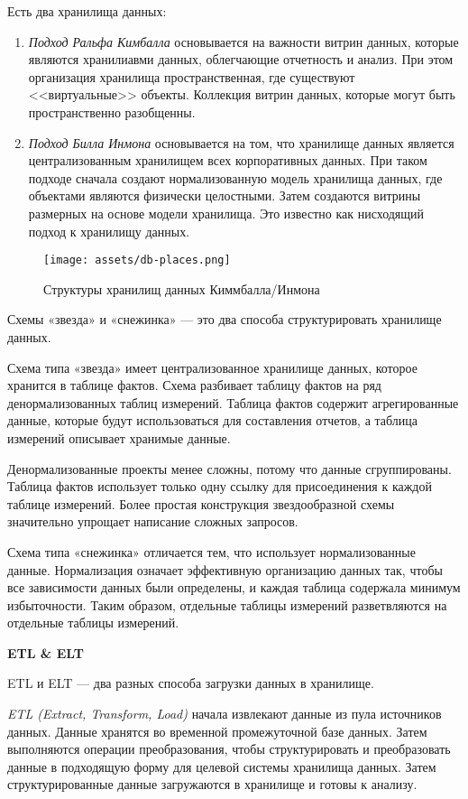 Есть два хранилища данных:
\begin{enumerate}
	\item \textit{Подход Ральфа Кимбалла} основывается на важности витрин данных, которые являются хранилиавми данных, облегчающие отчетность и анализ. При этом организация хранилища пространственная, где существуют <<виртуальные>> объекты. Коллекция витрин данных, которые могут быть пространственно разобщенны.
	\item \textit{Подход Билла Инмона} основывается на том, что хранилище данных является централизованным хранилищем всех корпоративных данных. При таком подходе сначала создают нормализованную модель хранилища данных, где объектами являются физически целостными. Затем создаются витрины размерных на основе модели хранилища. Это известно как нисходящий подход к хранилищу данных.
\end{enumerate}

\begin{figure}[ht!]
	\centering
	\texttt{[image: assets/db-places.png]}
	\caption{Структуры хранилищ данных Киммбалла/Инмона} 
\end{figure}
\FloatBarrier

Схемы «звезда» и «снежинка» — это два способа структурировать хранилище данных.

Схема типа «звезда» имеет централизованное хранилище данных, которое хранится в таблице фактов. Схема разбивает таблицу фактов на ряд денормализованных таблиц измерений. Таблица фактов содержит агрегированные данные, которые будут использоваться для составления отчетов, а таблица измерений описывает хранимые данные. 

Денормализованные проекты менее сложны, потому что данные сгруппированы. Таблица фактов использует только одну ссылку для присоединения к каждой таблице измерений. Более простая конструкция звездообразной схемы значительно упрощает написание сложных запросов.

Схема типа «снежинка» отличается тем, что использует нормализованные данные. Нормализация означает эффективную организацию данных так, чтобы все зависимости данных были определены, и каждая таблица содержала минимум избыточности. Таким образом, отдельные таблицы измерений разветвляются на отдельные таблицы измерений.

\textbf{ETL \&  ELT}

ETL и ELT — два разных способа загрузки данных в хранилище.

\textit{ETL (Extract, Transform, Load)} начала извлекают данные из пула источников данных. Данные хранятся во временной промежуточной базе данных. Затем выполняются операции преобразования, чтобы структурировать и преобразовать данные в подходящую форму для целевой системы хранилища данных. Затем структурированные данные загружаются в хранилище и готовы к анализу.

